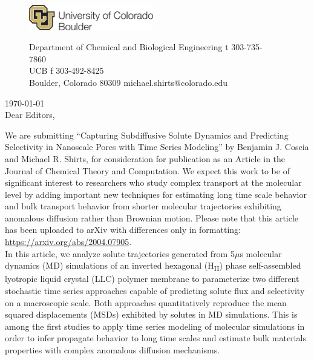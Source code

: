 \documentclass[fontsize=11pt]{article}
\begin{document}
	\graphicspath{{./figures/}}

	\begin{figure}
	\centering
	\begin{minipage}{0.37\textwidth}
	\includegraphics[width=2.14in,left]{CUBoulder.pdf}
	\end{minipage}
	\begin{minipage}{0.62\textwidth}
	\scriptsize
	\noindent Department of Chemical and Biological Engineering \hfill t 303-735-7860~~~~~~~~~~~~~~~~~~ \\
	 UCB \hfill f 303-492-8425~~~~~~~~~~~~~~~~~~ \\
	\noindent Boulder, Colorado 80309 \hfill michael.shirts@colorado.edu \\
	\end{minipage}
	\end{figure}
	
	\noindent \today \\

	\noindent Dear Editors,\\
	
	\newcommand{\ManuscriptTitle}{Capturing Subdiffusive Solute Dynamics and 
	Predicting Selectivity in Nanoscale Pores with Time Series Modeling}
	
	We are submitting ``\ManuscriptTitle'' by Benjamin J. Coscia
        and Michael R.  Shirts, for consideration for publication as
        an Article in the Journal of Chemical Theory and
        Computation. We expect this work to be of significant interest
        to researchers who study complex transport at the molecular
        level by adding important new techniques for estimating long
        time scale behavior and bulk transport behavior from shorter
        molecular trajectories exhibiting anomalous diffusion rather
        than Brownian motion. Please note that this article has been
        uploaded to arXiv with differences only in formatting:
        \href{https://arxiv.org/abs/2004.07905}{https://arxiv.org/abs/2004.07905}. \\
	
	In this article, we analyze solute trajectories generated from
        5$\mu$s molecular dynamics (MD) simulations of an inverted
        hexagonal (H\textsubscript{II}) phase self-assembled lyotropic
        liquid crystal (LLC) polymer membrane to parameterize two
        different stochastic time series approaches capable of
        predicting solute flux and selectivity on a macroscopic
        scale. Both approaches quantitatively reproduce the mean
        squared displacements (MSDs) exhibited by solutes in MD
        simulations. This is among the first studies to apply time
        series modeling of molecular simulations in order to infer
        propagate behavior to long time scales and estimate bulk
        materials properties with complex anomalous diffusion
        mechanisms.\\
\end{document}
